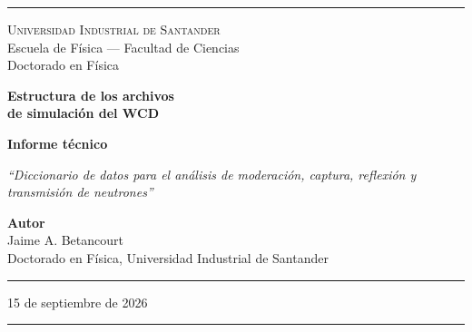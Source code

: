 \documentclass[11pt,a4paper]{article}
\begin{document}
\pagestyle{empty}


\begin{titlepage}
\begin{center}

\vspace*{0.5cm}
\textcolor{reglaColor}{\rule{\linewidth}{1.2pt}}

\vspace{1.3cm}
{\Large\scshape Universidad Industrial de Santander}\\[0.2cm]
{\large Escuela de Física --- Facultad de Ciencias}\\[0.2cm]
{\large Doctorado en Física}

\vspace{2.2cm}
{\Huge\bfseries\color{tituloColor} Estructura de los archivos\\[0.2cm]
de simulación del WCD}

\vspace{1.8cm}
{\large\textbf{Informe técnico}}

\vspace{0.6cm}
\begin{minipage}{0.85\linewidth}
\centering
\textit{``Diccionario de datos para el análisis de moderación, captura, reflexión
y transmisión de neutrones''}
\end{minipage}

\vfill

{\large\textbf{Autor}}\\[0.15cm]
Jaime A. Betancourt\\[0.1cm]
Doctorado en Física, Universidad Industrial de Santander

\vspace{1.2cm}
\textcolor{reglaColor}{\rule{0.5\linewidth}{0.6pt}}

\vspace{1cm}
15 de septiembre de 2026

\vspace{1cm}
\textcolor{reglaColor}{\rule{\linewidth}{1.2pt}}

\end{center}
\end{titlepage}

\pagestyle{plain}
\end{document}
